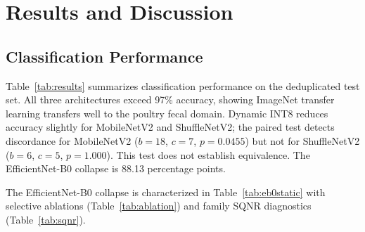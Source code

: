 \documentclass[conference,a4paper]{IEEEtran}
\begin{document}
\section{Results and Discussion}

\subsection{Classification Performance}

Table~\ref{tab:results} summarizes classification performance on the deduplicated test set. All three architectures exceed 97\% accuracy, showing ImageNet transfer learning transfers well to the poultry fecal domain. Dynamic INT8 reduces accuracy slightly for MobileNetV2 and ShuffleNetV2; the paired test detects discordance for MobileNetV2 ($b{=}18$, $c{=}7$, $p{=}0.0455$) but not for ShuffleNetV2 ($b{=}6$, $c{=}5$, $p{=}1.000$). This test does not establish equivalence. The EfficientNet-B0 collapse is 88.13 percentage points.

\begin{table}[htbp]
\caption{Test accuracy on deduplicated split (1,728 images); dynamic INT8 PTQ (ORT). Macro-F1 (balanced acc.); brackets: 95\% bootstrap percentile CI (B=10,000, seed 42; EfficientNet-B0 only).}
\label{tab:results}
\centering
\setlength{\tabcolsep}{4pt}
\end{table}

The EfficientNet-B0 collapse is characterized in Table~\ref{tab:eb0static} with selective ablations (Table~\ref{tab:ablation}) and family SQNR diagnostics (Table~\ref{tab:sqnr}).
\end{document}
